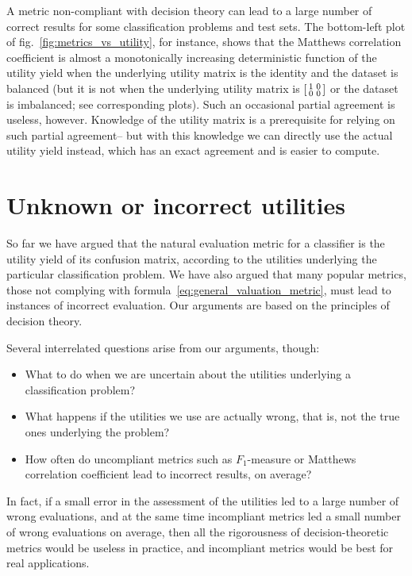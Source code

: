 \documentclass[\ifafour a4paper,12pt,\else a5paper,10pt,\fi%
onecolumn,oneside,article,%
british%
]{memoir}
\theoremstyle{remark}
\theoremstyle{innote}
\renewcommand*{\|}[1][]{\nonscript\:#1\vert\nonscript\:\mathopen{}}
\newcommand*{\fig}{fig.}%
\begin{document}
\medskip

A metric non-compliant with decision theory can lead to a large number of correct results for some classification problems and test sets. The bottom-left plot of \fig~\ref{fig:metrics_vs_utility}, for instance, shows that the Matthews correlation coefficient is almost a monotonically increasing deterministic function of the utility yield when the underlying utility matrix is the identity and the dataset is balanced (but it is not when the underlying utility matrix is $\begin{bsmallmatrix} 1&0\\0&0 \end{bsmallmatrix}$ or the dataset is imbalanced; see corresponding plots). Such an occasional partial agreement is useless, however. Knowledge of the utility matrix is a prerequisite for relying on such partial agreement-- but with this knowledge we can directly use the actual utility yield instead, which has an exact agreement and is easier to compute.


\section{Unknown or incorrect utilities}
\label{sec:unknown_wrong_utilities}

So far we have argued that the natural evaluation metric for a classifier is the utility yield of its confusion matrix, according to the utilities underlying the particular classification problem. We have also argued that many popular metrics, those not complying with formula~\eqref{eq:general_valuation_metric}, must lead to instances of incorrect evaluation. Our arguments are based on the principles of decision theory.

Several interrelated questions arise from our arguments, though:
\begin{itemize}
\item What to do when we are uncertain about the utilities underlying a classification problem?
\item What happens if the utilities we use are actually wrong, that is, not the true ones underlying the problem?
\item How often do uncompliant metrics such as $F_{1}$-measure or Matthews correlation coefficient lead to incorrect results, on average?
\end{itemize}
In fact, if a small error in the assessment of the utilities led to a large number of wrong evaluations, and at the same time incompliant metrics led a small number of wrong evaluations on average, then all the rigorousness of decision-theoretic metrics would be useless in practice, and  incompliant metrics would be best for real applications.
\end{document}
